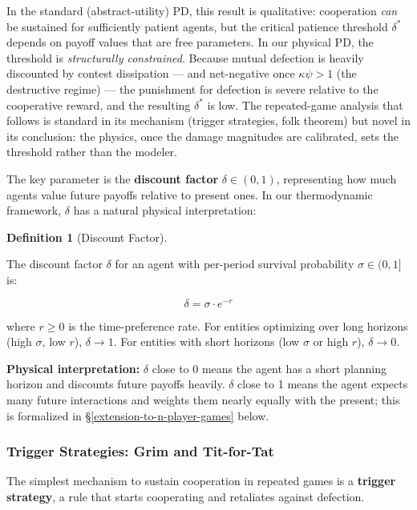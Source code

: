 \documentclass[11pt]{article}
\theoremstyle{plain}
\theoremstyle{definition}
\newtheorem{definition}{Definition}
\theoremstyle{remark}
\let\origsubsubsection\subsubsection
\renewcommand{\subsubsection}{\needspace{4\baselineskip}\origsubsubsection}
\begin{document}
In the standard (abstract-utility) PD, this result is qualitative:
cooperation \emph{can} be sustained for sufficiently patient agents, but
the critical patience threshold \(\delta^*\) depends on payoff values
that are free parameters. In our physical PD, the threshold is
\emph{structurally constrained}. Because mutual defection is heavily
discounted by contest dissipation --- and net-negative once
\(\kappa\psi > 1\) (the destructive regime) --- the punishment for
defection is severe relative to the cooperative reward, and the
resulting \(\delta^*\) is low. The repeated-game analysis that follows
is standard in its mechanism (trigger strategies, folk theorem) but
novel in its conclusion: the physics, once the damage magnitudes are
calibrated, sets the threshold rather than the modeler.

The key parameter is the \textbf{discount factor} \(\delta \in (0, 1)\),
representing how much agents value future payoffs relative to present
ones. In our thermodynamic framework, \(\delta\) has a natural physical
interpretation:

\begin{definition}[Discount Factor]
\label{def-discount-factor}

The discount factor $\delta$ for an agent with per-period survival probability $\sigma \in (0, 1]$ is:

$$\delta = \sigma \cdot e^{-r}$$

where $r \geq 0$ is the time-preference rate. For entities optimizing over long horizons (high $\sigma$, low $r$), $\delta \to 1$. For entities with short horizons (low $\sigma$ or high $r$), $\delta \to 0$.
\end{definition}

\textbf{Physical interpretation:} \(\delta\) close to 0 means the agent
has a short planning horizon and discounts future payoffs heavily.
\(\delta\) close to 1 means the agent expects many future interactions
and weights them nearly equally with the present; this is formalized in
§\ref{extension-to-n-player-games} below.

\subsubsection{Trigger Strategies: Grim and
Tit-for-Tat}\label{trigger-strategies-grim-and-tit-for-tat}

The simplest mechanism to sustain cooperation in repeated games is a
\textbf{trigger strategy}, a rule that starts cooperating and retaliates
against defection.
\end{document}
